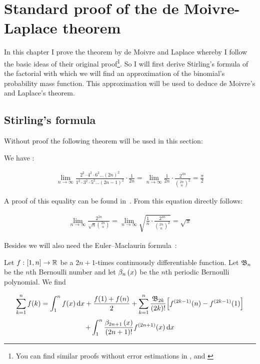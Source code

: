 \chapter{Standard proof of the de Moivre-Laplace theorem}

In this chapter I prove the theorem by de Moivre and Laplace whereby I follow the basic ideas of their original proof\footnote{You can find similar proofs without error estimations in \cite[pp. 64-67]{irle}, \cite[pp. 131-134]{georgii} and \cite{wiki:demoivrelaplace}}. So I will first derive Stirling's formula of the factorial with which we will find an approximation of the binomial's probability mass function. This approximation will be used to deduce de Moivre's and Laplace's theorem.

\section{Stirling's formula}

Without proof the following theorem will be used in this section:

\begin{theorem}
  We have \cite[pp. 505, 63]{heuser}:

  \begin{align}
    \lim_{n\to\infty} \frac{2^2\cdot4^2\cdot6^2\dots(2n)^2}{1^2\cdot3^2\cdot5^2\dots(2n-1)^2}\cdot \frac{1}{2n} = \lim_{n\to\infty} \frac{1}{2n} \cdot \frac{2^{4n}}{\binom{2n}{n}^2} = \frac{\pi}{2}
  \end{align}
\end{theorem}

\noindent A proof of this equality can be found in~\cite[pp. 504-505]{heuser}. From this equation directly follows:

\begin{align} \label{wallis}
  \lim_{n\to\infty} \frac{2^{2n}}{\sqrt n \binom{2n}{n}} = \lim_{n\to\infty} \sqrt{\frac 1n \cdot \frac{2^{4n}}{\binom{2n}{n}^2}} = \sqrt \pi
\end{align}

\noindent Besides we will also need the Euler–Maclaurin formula~\cite[p. 226]{koenigsberger}:

\begin{theorem}
  Let $f:[1,n]\to\mathbb R$ be a $2n+1$-times continuously differentiable function. Let $\mathfrak{B}_{n}$ be the $n$th Bernoulli number and let $\beta_{n}\left({x}\right)$ be the $n$th periodic Bernoulli polynomial. We find

  \begin{multline} \label{euler-maclaurin-formula}
    \sum_{k=1}^n f(k) = \int_1^n f(x)\d{x} + \frac{f(1)+f(n)}{2} + \sum_{k=1}^n \frac{\bn[2k]}{(2k)!} \Big[f^{(2k-1)}(n) - f^{(2k-1)}(1)\Big] \nl
     + \int_1^n \frac{\bp[2n+1]{x}}{(2n+1)!} f^{(2n+1)}(x) \d{x}
  \end{multline}
\end{theorem}

